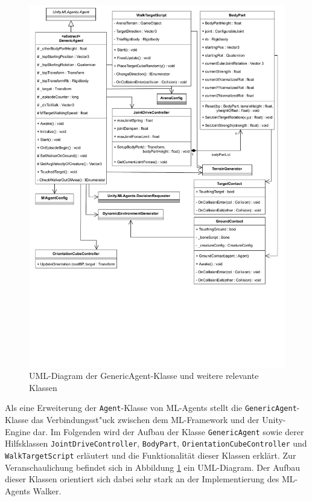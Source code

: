 \begin{figure}
	\includegraphics[width=\textwidth, trim={0cm 6.5cm 0cm 0cm}, clip]{resources/img/PG_Agent.drawio.pdf}
	\caption{UML-Diagram der GenericAgent-Klasse und weitere relevante Klassen}
	\label{fig:umlAgent}
\end{figure}

Als eine Erweiterung der \texttt{Agent}-Klasse von ML-Agents stellt die \texttt{GenericAgent}-Klasse das Verbindungsst"uck zwischen dem ML-Framework und der Unity-Engine dar. Im Folgenden wird der Aufbau der Klasse \texttt{GenericAgent} sowie derer Hilfsklassen \texttt{JointDrive\-Controller}, \texttt{BodyPart}, \texttt{OrientationCubeController} und \texttt{WalkTargetScript} erläutert und die Funktionalität dieser Klassen erklärt. Zur Veranschaulichung befindet sich in Abbildung \ref{fig:umlAgent} ein UML-Diagram. Der Aufbau dieser Klassen orientiert sich dabei sehr stark an der Implementierung des ML-Agents Walker.

